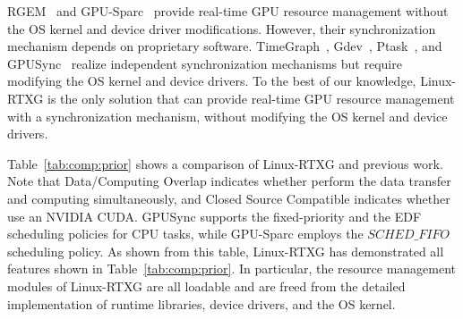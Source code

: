 \label{sec:relatedwork}
\begin{table*}[t]
\begin{center}
\caption{Linux-RTXG vs Prior Work}
\label{tab:comp:prior}
\ifthesis
{}
\fi
\end{center}
\vspace{-4mm}
\end{table*}
RGEM~\cite{kato:rgem} and GPU-Sparc~\cite{sparc} provide real-time GPU resource management without the OS kernel and device driver modifications.
However, their synchronization mechanism depends on proprietary software.
TimeGraph~\cite{kato:timegraph}, Gdev~\cite{kato:gdev}, Ptask~\cite{ptask}, and GPUSync~\cite{elliott:gpusync13} realize independent synchronization mechanisms but require modifying the OS kernel and device drivers.
To the best of our knowledge, Linux-RTXG is the only solution that can provide real-time GPU resource management with a synchronization mechanism, without modifying the OS kernel and device drivers.

Table~\ref{tab:comp:prior} shows a comparison of Linux-RTXG and previous work.
Note that Data/Computing Overlap indicates whether perform the data transfer and computing simultaneously, and Closed Source Compatible indicates whether use an NVIDIA  CUDA.
GPUSync supports the fixed-priority and the EDF scheduling policies for CPU tasks, while GPU-Sparc employs the $SCHED\_FIFO$ scheduling policy.
As shown from this table, Linux-RTXG has demonstrated all features shown in Table~\ref{tab:comp:prior}.
In particular, the resource management modules of Linux-RTXG are all loadable and are freed from the detailed implementation of runtime libraries, device drivers, and the OS kernel.

